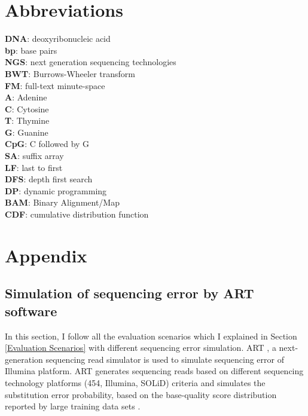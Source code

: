 \documentclass[11pt,a4paper]{report}
\begin{document}

\section{Abbreviations} \label{Abbreviations}

\textbf{DNA}: deoxyribonucleic acid\\
\textbf{bp}: base pairs\\
\textbf{NGS}: next generation sequencing technologies\\
\textbf{BWT}: Burrows-Wheeler transform\\
\textbf{FM}: full-text minute-space\\
\textbf{A}: Adenine\\
\textbf{C}: Cytosine\\
\textbf{T}: Thymine\\
\textbf{G}: Guanine\\
\textbf{CpG}: C followed by G\\
\textbf{SA}: suffix array\\
\textbf{LF}: last to first\\
\textbf{DFS}: depth first search\\
\textbf{DP}: dynamic programming\\
\textbf{BAM}: Binary Alignment/Map\\
\textbf{CDF}: cumulative distribution function




\newpage
\appendix
\section*{Appendix}
\renewcommand{\thesubsection}{\Alph{subsection}}

\subsection{Simulation of sequencing error by ART software} 
\label{Simulation sequencing error by ART software}

In this section, I follow all the evaluation scenarios which I explained in
Section \ref{Evaluation Scenarios}  with different sequencing error simulation.
ART \cite{art}, a next-generation sequencing read simulator is used to simulate sequencing
error of Illumina platform. 
ART generates sequencing reads based on different sequencing technology 
platforms (454, Illumina, SOLiD) criteria \cite{art} and simulates the
substitution error probability, based on the base-quality 
score distribution reported by large training data sets \cite{art}.\\
\end{document}
